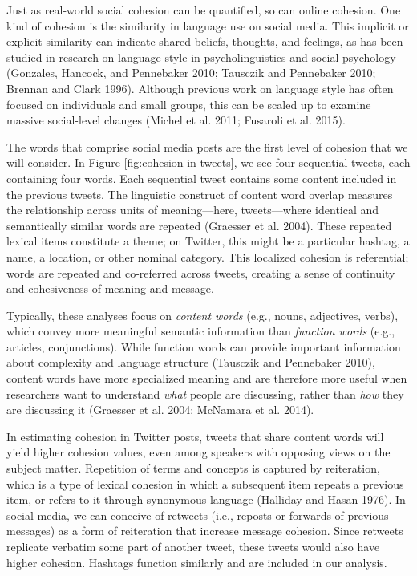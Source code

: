 \documentclass[
  english,
  man]{apa6}
\begin{document}
Just as real-world social cohesion can be quantified, so can online cohesion.
One kind of cohesion is the similarity in language use on social
media. This implicit or explicit similarity can indicate shared
beliefs, thoughts, and feelings, as has been studied in research on language
style in psycholinguistics and social psychology (Gonzales, Hancock, and Pennebaker 2010; Tausczik and Pennebaker 2010; Brennan and Clark 1996). Although previous work on language style has often
focused on individuals and small groups, this can be scaled up to examine
massive social-level changes (Michel et al. 2011; Fusaroli et al. 2015).

The words that comprise social media posts are the first level of cohesion that
we will consider. In Figure \ref{fig:cohesion-in-tweets}, we see four
sequential tweets, each containing four words. Each sequential tweet contains
some content included in the previous tweets. The linguistic construct of
content word overlap measures the relationship across units of meaning---here,
tweets---where identical and semantically similar words are repeated
(Graesser et al. 2004). These repeated lexical items constitute a theme; on Twitter,
this might be a particular hashtag, a name, a location, or other nominal
category. This localized cohesion is referential; words are repeated and
co-referred across tweets, creating a sense of continuity and cohesiveness of
meaning and message.

Typically, these analyses focus on \emph{content words} (e.g., nouns, adjectives,
verbs), which convey more meaningful semantic information than \emph{function words}
(e.g., articles, conjunctions). While function words can provide important
information about complexity and language structure
(Tausczik and Pennebaker 2010), content words have more specialized meaning and
are therefore more useful when researchers want to understand \emph{what} people are
discussing, rather than \emph{how} they are discussing it (Graesser et al. 2004; McNamara et al. 2014).

In estimating cohesion in Twitter posts, tweets that share content words
will yield higher cohesion values, even among speakers with opposing
views on the subject matter. Repetition of terms and concepts is captured by
reiteration, which is a type of lexical cohesion in which a subsequent item
repeats a previous item, or refers to it through synonymous language
(Halliday and Hasan 1976). In social media, we can conceive of retweets (i.e., reposts
or forwards of previous messages) as a form of reiteration
that increase message cohesion. Since retweets replicate verbatim some part of
another tweet, these tweets would also have higher cohesion. Hashtags function
similarly and are included in our analysis.
\end{document}

